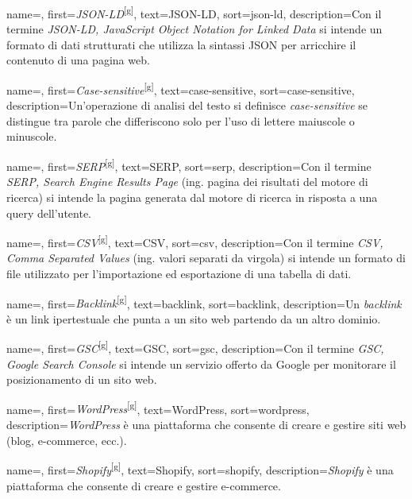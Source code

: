  {
    name=,
    first={\textit{JSON-LD}\textsuperscript{[g]}},
    text=JSON-LD,
    sort=json-ld,
    description={Con il termine \emph{JSON-LD, JavaScript Object Notation for Linked Data} si intende un formato di dati strutturati che utilizza la sintassi JSON per arricchire il contenuto di una pagina web.}
}

 {
    name=,
    first={\textit{Case-sensitive}\textsuperscript{[g]}},
    text=case-sensitive,
    sort=case-sensitive,
    description={Un'operazione di analisi del testo si definisce \emph{case-sensitive} se distingue tra parole che differiscono solo per l'uso di lettere maiuscole o minuscole.}
}

 {
    name=,
    first={\textit{SERP}\textsuperscript{[g]}},
    text=SERP,
    sort=serp,
    description={Con il termine \emph{SERP, Search Engine Results Page} (ing. pagina dei risultati del motore di ricerca) si intende la pagina generata dal motore di ricerca in risposta a una query dell'utente.}
}

 {
    name=,
    first={\textit{CSV}\textsuperscript{[g]}},
    text=CSV,
    sort=csv,
    description={Con il termine \emph{CSV, Comma Separated Values} (ing. valori separati da virgola) si intende un formato di file utilizzato per l'importazione ed esportazione di una tabella di dati.}
}

 {
    name=,
    first={\textit{Backlink}\textsuperscript{[g]}},
    text=backlink,
    sort=backlink,
    description={Un \emph{backlink} è un link ipertestuale che punta a un sito web partendo da un altro dominio.}
}

 {
    name=,
    first={\textit{GSC}\textsuperscript{[g]}},
    text=GSC,
    sort=gsc,
    description={Con il termine \emph{GSC, Google Search Console} si intende un servizio offerto da Google per monitorare il posizionamento di un sito web.}
}

 {
    name=,
    first={\textit{WordPress}\textsuperscript{[g]}},
    text=WordPress,
    sort=wordpress,
    description={\emph{WordPress} è una piattaforma che consente di creare e gestire siti web (blog, e-commerce, ecc.).}
}

 {
    name=,
    first={\textit{Shopify}\textsuperscript{[g]}},
    text=Shopify,
    sort=shopify,
    description={\emph{Shopify} è una piattaforma che consente di creare e gestire e-commerce.}
}

